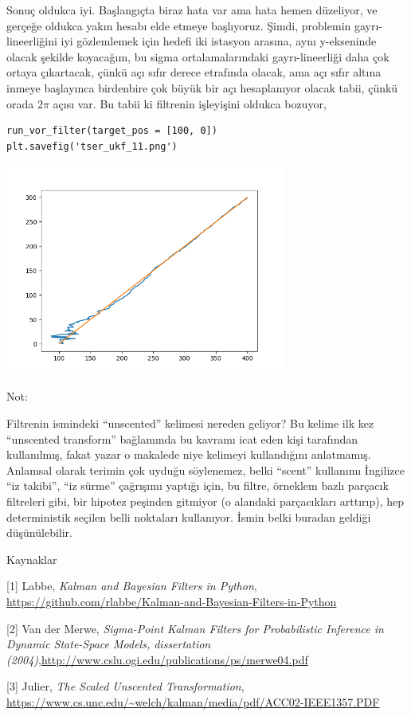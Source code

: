 \documentclass[12pt,fleqn]{article}\usepackage{../../common}
\begin{document}
Sonuç oldukca iyi. Başlangıçta biraz hata var ama hata hemen düzeliyor, ve
gerçeğe oldukca yakın hesabı elde etmeye başlıyoruz. Şimdi, problemin
gayrı-lineerliğini iyi gözlemlemek için hedefi iki istasyon arasına, aynı
y-ekseninde olacak şekilde koyacağım, bu sigma ortalamalarındaki
gayrı-lineerliği daha çok ortaya çıkartacak, çünkü açı sıfır derece
etrafında olacak, ama açı sıfır altına inmeye başlayınca birdenbire çok
büyük bir açı hesaplanıyor olacak tabii, çünkü orada $2\pi$ açısı var. Bu
tabii ki filtrenin işleyişini oldukca bozuyor,

\begin{verbatim}
run_vor_filter(target_pos = [100, 0])
plt.savefig('tser_ukf_11.png')
\end{verbatim}

\includegraphics[width=25em]{tser_ukf_11.png}

Not: 

Filtrenin ismindeki ``unscented'' kelimesi nereden geliyor? Bu kelime ilk
kez ``unscented transform'' bağlamında bu kavramı icat eden kişi tarafından
kullanılmış, fakat yazar o makalede niye kelimeyi kullandığını
anlatmamış. Anlamsal olarak terimin çok uyduğu söylenemez, belki ``scent''
kullanımı İngilizce ``iz takibi'', ``iz sürme'' çağrışımı yaptığı için, bu
filtre, örneklem bazlı parçacık filtreleri gibi, bir hipotez peşinden
gitmiyor (o alandaki parçacıkları arttırıp), hep deterministik seçilen
belli noktaları kullanıyor. İsmin belki buradan geldiği düşünülebilir.

Kaynaklar

[1] Labbe, {\em Kalman and Bayesian Filters in Python}, \url{https://github.com/rlabbe/Kalman-and-Bayesian-Filters-in-Python}

[2] Van der Merwe, {\em Sigma-Point Kalman Filters for Probabilistic Inference in Dynamic State-Space Models, dissertation (2004)},\url{http://www.cslu.ogi.edu/publications/ps/merwe04.pdf}  

[3] Julier, {\em The Scaled Unscented Transformation}, \url{https://www.cs.unc.edu/~welch/kalman/media/pdf/ACC02-IEEE1357.PDF}
\end{document}
